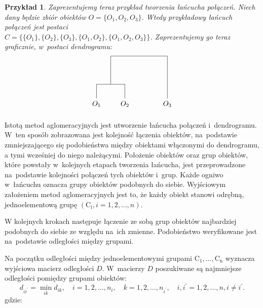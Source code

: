 \documentclass[12pt,a4paper]{report}
\newtheorem{example}{Przykład}
\begin{document}
\begin{example}
Zaprezentujemy teraz przykład tworzenia łańcucha połączeń. Niech dany będzie zbiór obiektów $O=\{O_1, O_2, O_3\}$. Wtedy przykładowy łańcuch połączeń jest postaci \\
$C=\{ \{O_1\}, \{O_2\}, \{O_3\}, \{O_1, O_2\}, \{O_1, O_2, O_3\} \}$. Zaprezentujemy go teraz graficznie, w~postaci dendrogramu: 
$$
\begin{tikzpicture}[scale=.7]
  \node (1) at (0.0,-0.40) {$O_{1}$};
  \node (2) at (2.0,-0.40) {$O_{2}$};
  \node (3) at (5,-0.40) {$O_{3}$}; 
   \draw (0,0)--(0,1); 
   \draw (0,1)--(2,1);
   \draw (2,0)--(2,1);
   \draw (1,1)--(1,3);
   \draw (1,3)--(5,3);
   \draw (5,0)--(5,3);
\end{tikzpicture}
$$ 
\end{example}



Istotą metod aglomeracyjnych jest utworzenie łańcucha połączeń i~dendrogramu. W~ten sposób zobrazowana jest kolejność łączenia obiektów, na~podstawie zmniejszającego się podobieństwa między obiektami włączonymi do dendrogramu, a tymi wcześniej do niego należącymi. Położenie obiektów oraz grup obiektów, które powstały w~kolejnych etapach tworzenia łańcucha, jest przeprowadzone na~podstawie kolejności połączeń tych obiektów i~grup. Każde ogniwo w~łańcuchu oznacza grupy obiektów podobnych do siebie. 
Wyjściowym założeniem metod aglomeracyjnych jest to, że każdy obiekt stanowi odrębną, jednoelementową grupę $(\mathrm{C_{i}}, i=1,2,\dots,n)$.

W kolejnych krokach następuje łączenie ze sobą grup obiektów najbardziej podobnych do siebie ze względu na~ich zmienne. Podobieństwo weryfikowane jest na~podstawie odległości między grupami.  %

Na początku odległości między jednoelementowymi grupami $\mathrm{C_{1}},\dots,\mathrm{C_{n}}$ wyznacza wyjściowa macierz odległości $D$. W~macierzy $D$ poszukiwane są najmniejsze odległości pomiędzy grupami obiektów:
$$
d_{ii^{'}}= \min\limits_{ik} {d_{ik}}, \quad i=1,2,\dots,n_{i}, \quad k=1,2,\dots,n_{i^{'}}, \quad i,i^{'}=1,2,\dots,n, i\neq i^{'}.
$$
gdzie:
\end{document}
